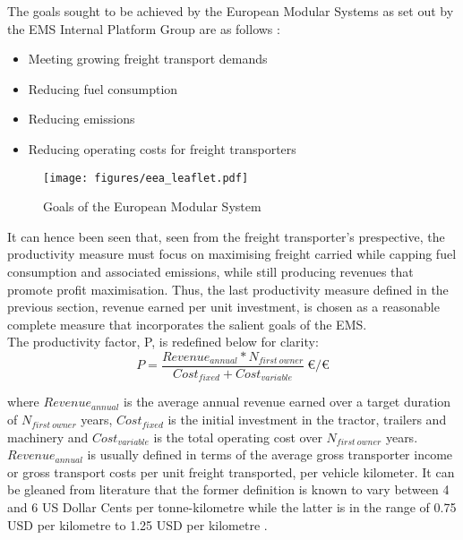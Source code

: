 \documentclass[ExampleMasters.tex]{subfiles}
\begin{document}
	The goals sought to be achieved by the European Modular Systems as set out by the EMS Internal Platform Group are as follows \cite{EMSleaflet}:
	\begin{itemize}
		\item Meeting growing freight transport demands
		\item Reducing fuel consumption
		\item Reducing emissions
		\item Reducing operating costs for freight transporters
	\end{itemize}

	\begin{figure}[h!]
		\centering
		\texttt{[image: figures/eea\_leaflet.pdf]}
		\caption{Goals of the European Modular System \cite{EMSleaflet}}
		\label{EMSleaflet}
	\end{figure}

	It can hence been seen that, seen from the freight transporter's prespective, the productivity measure must focus on maximising freight carried while capping fuel consumption and associated emissions, while still producing revenues that promote profit maximisation. Thus, the last productivity measure defined in the previous section, revenue earned per unit investment, is chosen as a reasonable complete measure that incorporates the salient goals of the EMS.\\ 

	The productivity factor, P, is redefined below for clarity:
	\begin{equation}
		P = \frac{Revenue_{annual}*N_{first\ owner}}{Cost_{fixed} + Cost_{variable}}\ \euro/\euro
	\end{equation}

	where $Revenue_{annual}$ is the average annual revenue earned over a target duration of $N_{first\ owner}$ years, $Cost_{fixed}$ is the initial investment in the tractor, trailers and machinery and $Cost_{variable}$ is the total operating cost over $N_{first\ owner}$ years.\\

	$Revenue_{annual}$ is usually defined in terms of the average gross transporter income or gross transport costs per unit freight transported, per vehicle kilometer. It can be gleaned from literature that the former definition is known to vary between 4 and 6 US Dollar Cents per tonne-kilometre \cite{WorldBankReport} while the latter is in the range of 0.75 USD per kilometre to 1.25 USD per kilometre \cite{WorldBankReport}.\\
\end{document}

